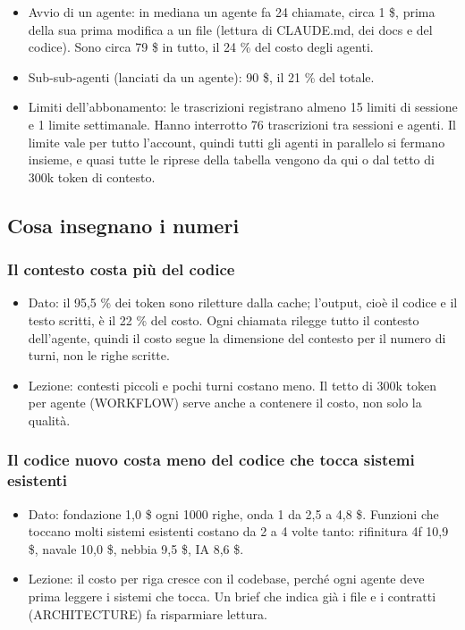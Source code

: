\documentclass[11pt]{article}
\begin{document}
\begin{itemize}
\item Avvio di un agente: in mediana un agente fa 24 chiamate, circa 1 \$, prima della sua prima modifica a un file
(lettura di CLAUDE.md, dei docs e del codice). Sono circa 79 \$ in tutto, il 24 \% del costo degli agenti.
\item Sub-sub-agenti (lanciati da un agente): 90 \$, il 21 \% del totale.
\item Limiti dell'abbonamento: le trascrizioni registrano almeno 15 limiti di sessione e 1 limite settimanale. Hanno
interrotto 76 trascrizioni tra sessioni e agenti. Il limite vale per tutto l'account, quindi tutti gli agenti in
parallelo si fermano insieme, e quasi tutte le riprese della tabella vengono da qui o dal tetto di 300k token di
contesto.
\end{itemize}
\subsection{Cosa insegnano i numeri}
\label{sec:org39dae0d}

\subsubsection{Il contesto costa più del codice}
\label{sec:org4e11c83}
\begin{itemize}
\item Dato: il 95,5 \% dei token sono riletture dalla cache; l'output, cioè il codice e il testo scritti, è il 22 \% del
costo. Ogni chiamata rilegge tutto il contesto dell'agente, quindi il costo segue la dimensione del contesto per il
numero di turni, non le righe scritte.
\item Lezione: contesti piccoli e pochi turni costano meno. Il tetto di 300k token per agente (WORKFLOW) serve anche
a contenere il costo, non solo la qualità.
\end{itemize}
\subsubsection{Il codice nuovo costa meno del codice che tocca sistemi esistenti}
\label{sec:org4ffb9c3}
\begin{itemize}
\item Dato: fondazione 1,0 \$ ogni 1000 righe, onda 1 da 2,5 a 4,8 \$. Funzioni che toccano molti sistemi esistenti
costano da 2 a 4 volte tanto: rifinitura 4f 10,9 \$, navale 10,0 \$, nebbia 9,5 \$, IA 8,6 \$.
\item Lezione: il costo per riga cresce con il codebase, perché ogni agente deve prima leggere i sistemi che tocca. Un
brief che indica già i file e i contratti (ARCHITECTURE) fa risparmiare lettura.
\end{itemize}
\end{document}

